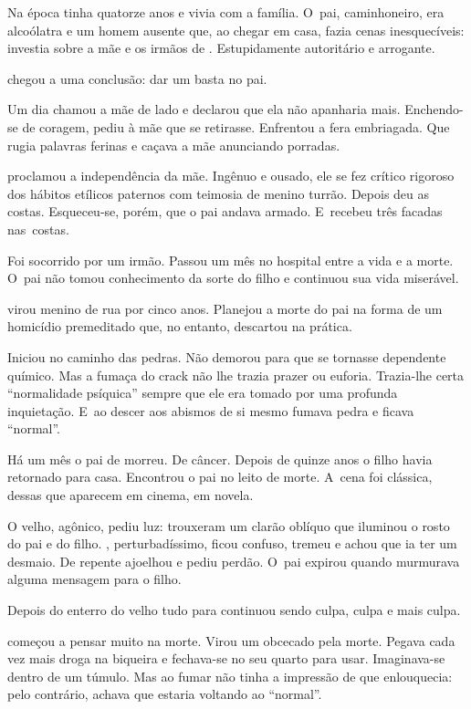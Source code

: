  

Na época  tinha quatorze anos e vivia com a família. O~pai,
caminhoneiro, era alcoólatra e um homem ausente que, ao chegar em casa,
fazia cenas inesquecíveis: investia sobre a mãe e os irmãos de .
Estupidamente autoritário e arrogante.

 chegou a uma conclusão: dar um basta no pai.

Um dia chamou a mãe de lado e declarou que ela não apanharia mais.
Enchendo-se de coragem, pediu à mãe que se retirasse. Enfrentou a fera
embriagada. Que rugia palavras ferinas e caçava a mãe anunciando
porradas.

 proclamou a independência da mãe. Ingênuo e ousado, ele se fez
crítico rigoroso dos hábitos etílicos paternos com teimosia de menino
turrão. Depois deu as costas. Esqueceu-se, porém, que o pai andava
armado. E~recebeu três facadas nas~costas.

Foi socorrido por um irmão. Passou um mês no hospital entre a vida e a
morte. O~pai não tomou conhecimento da sorte do filho e continuou sua
vida miserável.

 virou menino de rua por cinco anos. Planejou a morte do pai na forma
de um homicídio premeditado que, no entanto, descartou na prática.

Iniciou no caminho das pedras. Não demorou para que se tornasse
dependente químico. Mas a fumaça do crack não lhe trazia prazer ou
euforia. Trazia-lhe certa ``normalidade psíquica'' sempre que ele era
tomado por uma profunda inquietação. E~ao descer aos abismos de si mesmo
fumava pedra e ficava ``normal''.

\asterisc{}

Há um mês o pai de  morreu. De câncer. Depois de quinze anos o filho
havia retornado para casa. Encontrou o pai no leito de morte. A~cena foi
clássica, dessas que aparecem em cinema, em novela.

O velho, agônico, pediu luz: trouxeram um clarão oblíquo que iluminou o
rosto do pai e do filho. , perturbadíssimo, ficou confuso, tremeu e
achou que ia ter um desmaio. De repente ajoelhou e pediu perdão. O~pai
expirou quando murmurava alguma mensagem para o filho.

\asterisc{}

Depois do enterro do velho tudo para  continuou sendo culpa, culpa e
mais culpa.

 começou a pensar muito na morte. Virou um obcecado pela morte. Pegava
cada vez mais droga na biqueira e fechava-se no seu quarto para usar.
Imaginava-se dentro de um túmulo. Mas ao fumar não tinha a impressão de
que enlouquecia: pelo contrário, achava que estaria voltando ao
``normal''.

